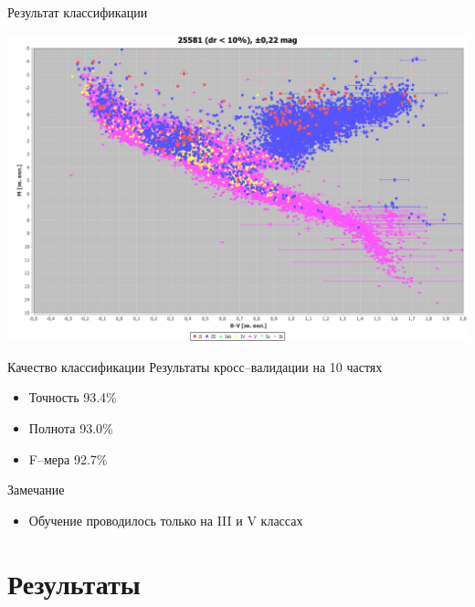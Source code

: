 \documentclass[14pt, fleqn, xcolor={dvipsnames, table}]{beamer}
\begin{document}
        \begin{frame}{Результат классификации}
            \begin{center}
                \includegraphics[scale=0.25]{ml-2.png}
            \end{center}             
        \end{frame}
        
        \begin{frame}{Качество классификации}
            Результаты кросс--валидации на 10 частях
            \begin{itemize}
                \item Точность 93.4\%
                \item Полнота 93.0\%
                \item F--мера 92.7\%
            \end{itemize}
            Замечание
            \begin{itemize}
                \item Обучение проводилось только на III и V классах
            \end{itemize}
        \end{frame}    

    \section{Результаты}                
        
\end{document}
